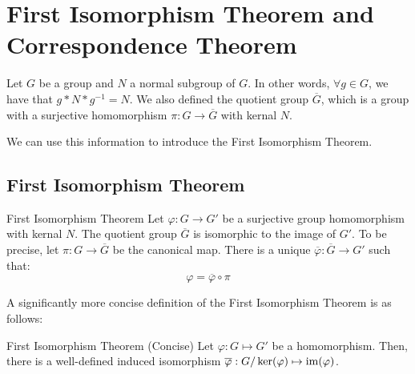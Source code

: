 \documentclass[letterpaper]{article}
\begin{document}
\newpage 
\section{First Isomorphism Theorem and Correspondence Theorem}
Let $G$ be a group and $N$ a normal subgroup of $G$. In other words, $\forall g \in G$, we have that $g * N * g^{-1} = N$. We also defined the quotient group $\overline{G}$, which is a group with a surjective homomorphism $\pi: G \to \overline{G}$ with kernal $N$.

\bigskip 

We can use this information to introduce the First Isomorphism Theorem. 

\subsection{First Isomorphism Theorem}
\begin{theorem}{First Isomorphism Theorem}{}
    Let $\varphi: G \to G'$ be a surjective group homomorphism with kernal $N$. The quotient group $\overline{G}$ is isomorphic to the image of $G'$. To be precise, let $\pi: G \to \overline{G}$ be the canonical map. There is a unique $\overline{\varphi}: \overline{G} \to G'$ such that:
    \[\varphi = \overline{\varphi} \circ \pi\] 
\end{theorem}
A significantly more concise definition of the First Isomorphism Theorem is as follows: 
\begin{theorem}{First Isomorphism Theorem (Concise)}{}
    Let $\varphi: G \mapsto G'$ be a homomorphism. Then, there is a well-defined induced isomorphism $\overline{\varphi}: G / \ker(\varphi) \mapsto \operatorname{im}(\varphi)$. 
\end{theorem}
\end{document}
